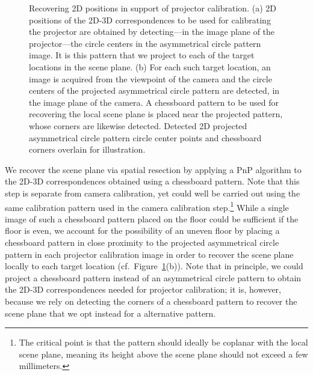 \documentclass[review]{elsarticle}
\begin{document}
\begin{figure}
    \centering
    \qquad
    \caption{Recovering 2D positions in support of projector calibration. (a) 2D positions of the 2D-3D correspondences to be used for calibrating the projector are obtained by detecting---in the image plane of the projector---the circle centers in the asymmetrical circle pattern image. It is this pattern that we project to each of the target locations in the scene plane. (b) For each such target location, an image is acquired from the viewpoint of the camera and the circle centers of the projected asymmetrical circle pattern are detected, in the image plane of the camera. A chessboard pattern to be used for recovering the local scene plane is placed near the projected pattern, whose corners are likewise detected. Detected 2D projected asymmetrical circle pattern circle center points and chessboard corners overlain for illustration.}
    \label{fig:2d}
\end{figure}

We recover the scene plane via spatial resection by applying a PnP algorithm \cite{collins2014infinitesimal} to the 2D-3D correspondences obtained using a chessboard pattern. Note that this step is separate from camera calibration, yet could well be carried out using the same calibration pattern used in the camera calibration step.\footnote{The critical point is that the pattern should ideally be coplanar with the local scene plane, meaning its height above the scene plane should not exceed a few millimeters.} While a single image of such a chessboard pattern placed on the floor could be sufficient if the floor is even, we account for the possibility of an uneven floor by placing a chessboard pattern in close proximity to the projected asymmetrical circle pattern in each projector calibration image in order to recover the scene plane locally to each target location (cf.\ Figure~\ref{fig:2d}(b)). Note that in principle, we could project a chessboard pattern instead of an asymmetrical circle pattern to obtain the 2D-3D correspondences needed for projector calibration; it is, however, because we rely on detecting the corners of a chessboard pattern to recover the scene plane that we opt instead for a alternative pattern.
\end{document}
